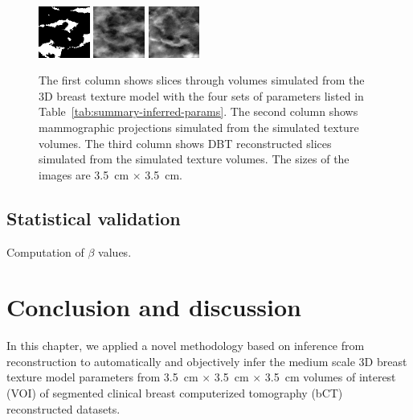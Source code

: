 \documentclass[journal]{IEEEtran}
\begin{document}
\begin{figure}[!htb]
  \includegraphics[width=0.15\textwidth]
  {figure/all/dataset_11/sim_vol_small}
  \includegraphics[width=0.15\textwidth]
  {figure/all/dataset_11/sim_proj}
  \includegraphics[width=0.15\textwidth]
  {figure/all/dataset_11/sim_recon}


  \caption{The first column shows slices through volumes simulated
    from the 3D breast texture model with the four sets of parameters
    listed in Table~\ref{tab:summary-inferred-params}. The second
    column shows mammographic projections simulated from the simulated
    texture volumes. The third column shows DBT reconstructed slices
    simulated from the simulated texture volumes. The sizes of the
    images are \SI{3.5}{\cm} $\times$ \SI{3.5}{\cm}.}
  \label{fig:fit-params-sims}
\end{figure}

\subsection{Statistical validation}
\label{sec:stat-valid}

Computation of $\beta$ values.

\section{Conclusion and discussion}
\label{sec:concl-disc}

In this chapter, we applied a novel methodology based on inference
from reconstruction to automatically and objectively infer the medium
scale 3D breast texture model parameters from \SI{3.5}{\cm} $\times$
\SI{3.5}{\cm} $\times$ \SI{3.5}{\cm} volumes of interest (VOI) of
segmented clinical breast computerized tomography (bCT) reconstructed
datasets.
\end{document}
